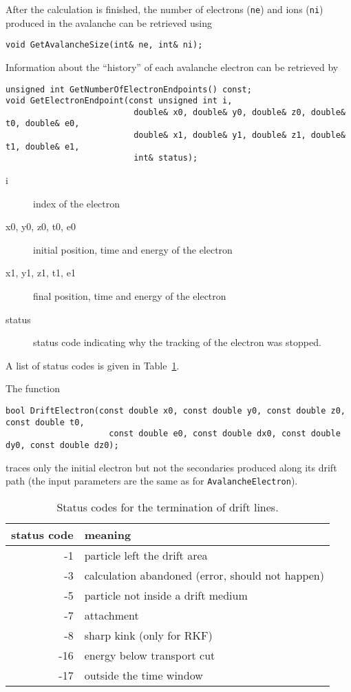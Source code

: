 After the calculation is finished, the number of electrons 
(\texttt{ne}) and ions (\texttt{ni})  
produced in the avalanche can be retrieved using
\begin{lstlisting}
void GetAvalancheSize(int& ne, int& ni);
\end{lstlisting}
Information about the ``history'' of each avalanche electron can be 
retrieved by
\begin{lstlisting}
unsigned int GetNumberOfElectronEndpoints() const;
void GetElectronEndpoint(const unsigned int i, 
                          double& x0, double& y0, double& z0, double& t0, double& e0,
                          double& x1, double& y1, double& z1, double& t1, double& e1,
                          int& status); 
\end{lstlisting}
\begin{description}
  \item[i] index of the electron
  \item[x0, y0, z0, t0, e0] initial position, time and energy of the electron
  \item[x1, y1, z1, t1, e1] final position, time and energy of the electron
  \item[status] status code indicating why the tracking of the electron was stopped.  
\end{description}
A list of status codes is given in Table~\ref{Tab:DriftLineStatusCodes}.

The function
\begin{lstlisting}
bool DriftElectron(const double x0, const double y0, const double z0, const double t0,
                     const double e0, const double dx0, const double dy0, const double dz0);
\end{lstlisting}
traces only the initial electron but not the secondaries 
produced along its drift path 
(the input parameters are the same as for \texttt{AvalancheElectron}).

\begin{table}
  \centering
  \begin{tabular}{r l}
    \toprule
    status code &  meaning\\
    \midrule
     -1 & particle left the drift area        \\
     -3 & calculation abandoned (error, should not happen) \\
     -5 & particle not inside a drift medium  \\
     -7 & attachment                          \\
     -8 & sharp kink (only for RKF)           \\
    -16 & energy below transport cut          \\
    -17 & outside the time window             \\
    \bottomrule
  \end{tabular}
  \caption{Status codes for the termination of drift lines.}
  \label{Tab:DriftLineStatusCodes}
\end{table}

